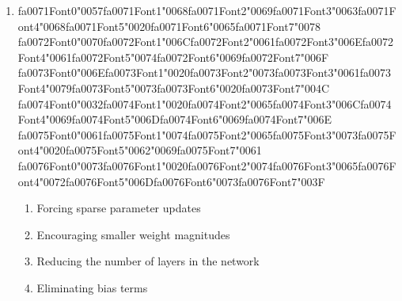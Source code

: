 \documentclass[12pt]{article}
\begin{document}
\begin{enumerate}[label=Q\arabic*.]
 \item {\csname fa0071Font0\endcsname\char"0057}{\csname fa0071Font1\endcsname\char"0068}{\csname fa0071Font2\endcsname\char"0069}{\csname fa0071Font3\endcsname\char"0063}{\csname fa0071Font4\endcsname\char"0068}{\csname fa0071Font5\endcsname\char"0020}{\csname fa0071Font6\endcsname\char"0065}{\csname fa0071Font7\endcsname\char"0078} {\csname fa0072Font0\endcsname\char"0070}{\csname fa0072Font1\endcsname\char"006C}{\csname fa0072Font2\endcsname\char"0061}{\csname fa0072Font3\endcsname\char"006E}{\csname fa0072Font4\endcsname\char"0061}{\csname fa0072Font5\endcsname\char"0074}{\csname fa0072Font6\endcsname\char"0069}{\csname fa0072Font7\endcsname\char"006F} {\csname fa0073Font0\endcsname\char"006E}{\csname fa0073Font1\endcsname\char"0020}{\csname fa0073Font2\endcsname\char"0073}{\csname fa0073Font3\endcsname\char"0061}{\csname fa0073Font4\endcsname\char"0079}{\csname fa0073Font5\endcsname\char"0073}{\csname fa0073Font6\endcsname\char"0020}{\csname fa0073Font7\endcsname\char"004C} {\csname fa0074Font0\endcsname\char"0032}{\csname fa0074Font1\endcsname\char"0020}{\csname fa0074Font2\endcsname\char"0065}{\csname fa0074Font3\endcsname\char"006C}{\csname fa0074Font4\endcsname\char"0069}{\csname fa0074Font5\endcsname\char"006D}{\csname fa0074Font6\endcsname\char"0069}{\csname fa0074Font7\endcsname\char"006E} {\csname fa0075Font0\endcsname\char"0061}{\csname fa0075Font1\endcsname\char"0074}{\csname fa0075Font2\endcsname\char"0065}{\csname fa0075Font3\endcsname\char"0073}{\csname fa0075Font4\endcsname\char"0020}{\csname fa0075Font5\endcsname\char"0062}{\char"0069}{\csname fa0075Font7\endcsname\char"0061} {\csname fa0076Font0\endcsname\char"0073}{\csname fa0076Font1\endcsname\char"0020}{\csname fa0076Font2\endcsname\char"0074}{\csname fa0076Font3\endcsname\char"0065}{\csname fa0076Font4\endcsname\char"0072}{\csname fa0076Font5\endcsname\char"006D}{\csname fa0076Font6\endcsname\char"0073}{\csname fa0076Font7\endcsname\char"003F}
 \begin{enumerate}[label=(\Alph*)]
     \item Forcing sparse parameter updates
     \item Encouraging smaller weight magnitudes
     \item Reducing the number of layers in the network
     \item Eliminating bias terms
 \end{enumerate}
 

\end{enumerate}
\end{document}
